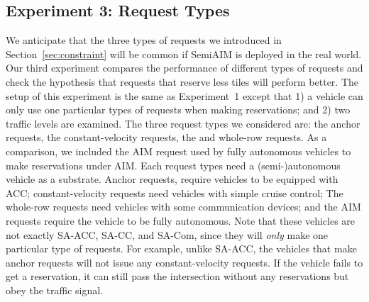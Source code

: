 




\subsection{Experiment 3: Request Types}

We anticipate that the three types of requests we introduced in
Section~\ref{sec:constraint} will be common if SemiAIM is deployed in
the real world.  Our third experiment compares the performance of
different types of requests and check the hypothesis that requests
that reserve less tiles will perform better.  The setup of this
experiment is the same as Experiment~1 except that 1) a vehicle can
only use one particular types of requests when making reservations;
and 2) two traffic levels are examined.  The three request types we
considered are: the anchor requests, the constant-velocity requests,
the and whole-row requests. As a comparison, we included the AIM
request used by fully autonomous vehicles to make reservations under
AIM. Each request types need a (semi-)autonomous vehicle as a
substrate.  Anchor requests, require vehicles to be equipped with ACC;
constant-velocity requests need vehicles with simple cruise control;
The whole-row requests need vehicles with some communication devices;
and the AIM requests require the vehicle to be fully autonomous.  Note
that these vehicles are not exactly SA-ACC, SA-CC, and SA-Com, since
they will \emph{only} make one particular type of requests.  For
example, unlike SA-ACC, the vehicles that make anchor requests will
not issue any constant-velocity requests.  If the vehicle fails to
get a reservation, it can still pass the intersection without any 
reservations but obey the traffic signal.

